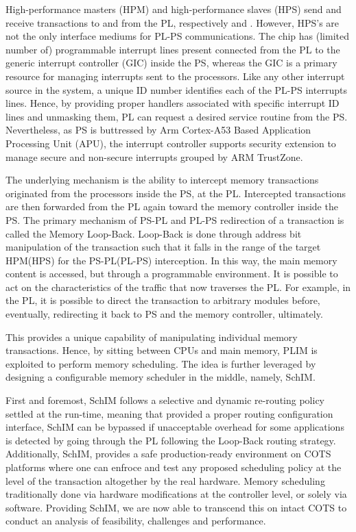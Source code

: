  High-performance masters (HPM) and high-performance slaves (HPS) send and receive transactions to and from the PL, respectively  and . However, HPS's are not the only interface mediums for PL-PS communications. The chip has (limited number of) programmable interrupt lines  present connected from the PL to the generic interrupt controller (GIC) inside the PS, whereas the GIC is a primary resource for managing interrupts sent to the processors. Like any other interrupt source in the system, a unique ID number identifies each of the PL-PS interrupts lines. Hence, by providing proper handlers associated with specific interrupt ID lines and unmasking them, PL can request a desired service routine from the PS. Nevertheless, as PS is buttressed by Arm Cortex-A53 Based Application Processing Unit (APU), the interrupt controller supports security extension to manage secure and non-secure interrupts grouped by  ARM TrustZone.


    The underlying mechanism is the ability to intercept memory transactions originated from the processors inside the PS, at the PL. Intercepted transactions are then forwarded from the PL again toward the memory controller inside the PS. The primary mechanism of PS-PL and PL-PS redirection of a transaction is called the Memory Loop-Back. Loop-Back is done through address bit manipulation of the transaction such that it falls in the range of the target HPM(HPS) for the PS-PL(PL-PS) interception. In this way, the main memory content is accessed, but through a programmable environment. It is possible to act on the characteristics of the traffic that now traverses the PL. For example, in the PL, it is possible to direct the transaction to arbitrary modules before, eventually, redirecting it back to PS and the memory controller, ultimately.

    This provides a unique capability of manipulating individual memory transactions. Hence, by sitting between CPUs and main memory, PLIM is exploited to perform memory scheduling. The idea is further leveraged by designing a configurable memory scheduler in the middle, namely, SchIM.


First and foremost, SchIM follows a selective and dynamic re-routing policy settled at the run-time, meaning that provided a proper routing configuration interface,  SchIM can be bypassed if unacceptable overhead for some applications is detected by going through the PL following the Loop-Back routing strategy. Additionally, SchIM, provides a safe production-ready environment on COTS platforms where one can enfroce and test any proposed scheduling policy at the level of the transaction altogether by the real hardware. Memory scheduling traditionally done via hardware modifications at the controller level, or solely via software. Providing SchIM, we are now able to transcend this on intact COTS to conduct an analysis of feasibility, challenges and performance. 


